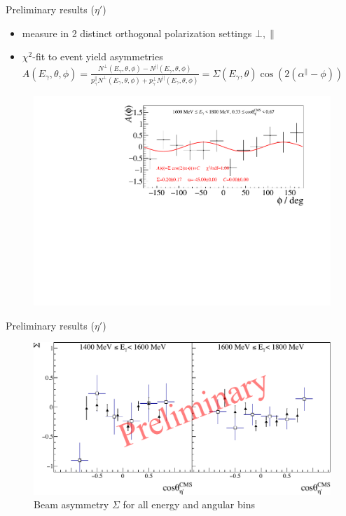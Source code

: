 \documentclass[11pt,aspectratio=169,dvipsnames]{beamer}
\newcommand{\thecolor}{black!70!blue}
\begin{document}
\begin{frame}{Preliminary results ($\eta'$)}
\begin{tcolorbox}[colback=blue!5,colframe=\thecolor,title={Method}]
	\begin{itemize}
		\item measure in 2 distinct orthogonal polarization settings $\bot,\parallel$
		\item $\chi^2$-fit to event yield asymmetries $A(E_\gamma,\theta,\phi)=\frac{N^\bot(E_\gamma,\theta,\phi)-N^\parallel(E_\gamma,\theta,\phi)}{p_\gamma^\parallel N^\bot(E_\gamma,\theta,\phi) + p_\gamma^\bot N^\parallel(E_\gamma,\theta,\phi)}=\Sigma(E_\gamma,\theta)\cos\left(2\left(\alpha^\parallel-\phi\right)\right)$
	\end{itemize}
\vspace{-0.5cm}
\begin{figure}
	\centering
	\includegraphics[width=.66\linewidth]{asym_bin}
\end{figure}

\end{tcolorbox}
\end{frame}
\begin{frame}{Preliminary results ($\eta'$)}
	\begin{figure}
		\centering
		\includegraphics[width=.9\linewidth]{sigma}
		\caption*{Beam asymmetry $\Sigma$ for all energy and angular bins}
	\end{figure}
\end{frame}
\end{document}
